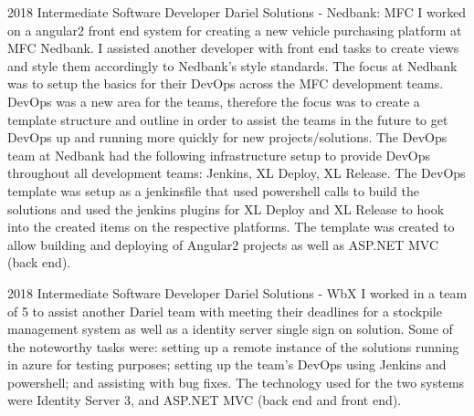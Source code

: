 \documentclass[]{friggeri-cv} %
\begin{document}
\newpage

\begin{entrylist}

\entry
{2018} %
{Intermediate Software Developer}
{Dariel Solutions - Nedbank: MFC}
{I worked on a angular2 front end system for creating a new vehicle purchasing platform at MFC Nedbank. I assisted another developer with front end tasks to create views and style them accordingly to Nedbank's style standards. The focus at Nedbank was to setup the basics for their DevOps across the MFC development teams. DevOps was a new area for the teams, therefore the focus was to create a template structure and outline in order to assist the teams in the future to get DevOps up and running more quickly for new projects/solutions. The DevOps team at Nedbank had the following infrastructure setup to provide DevOps throughout all development teams: Jenkins, XL Deploy, XL Release. The DevOps template was setup as a jenkinsfile that used powershell calls to build the solutions and used the jenkins plugins for XL Deploy and XL Release to hook into the created items on the respective platforms. The template was created to allow building and deploying of Angular2 projects as well as ASP.NET MVC (back end).}

\entry
{2018} %
{Intermediate Software Developer}
{Dariel Solutions - WbX}
{I worked in a team of 5 to assist another Dariel team with meeting their deadlines for a stockpile management system as well as a identity server single sign on solution. Some of the noteworthy tasks were: setting up a remote instance of the solutions running in azure for testing purposes; setting up the team's DevOps using Jenkins and powershell; and assisting with bug fixes. The technology used for the two systems were Identity Server 3, and ASP.NET MVC (back end and front end).}


\end{entrylist}
\end{document}
